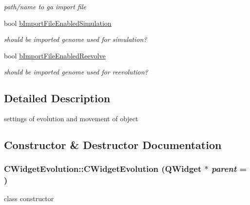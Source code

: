 \begin{DoxyCompactItemize}
\begin{DoxyCompactList}\small\item\em path/name to ga import file \item\end{DoxyCompactList}\item 
\hypertarget{classCWidgetEvolution_a84cb3c7dd3d052de094c1a306b473395}{
bool \hyperlink{classCWidgetEvolution_a84cb3c7dd3d052de094c1a306b473395}{bImportFileEnabledSimulation}}
\label{classCWidgetEvolution_a84cb3c7dd3d052de094c1a306b473395}

\begin{DoxyCompactList}\small\item\em should be imported genome used for simulation? \item\end{DoxyCompactList}\item 
\hypertarget{classCWidgetEvolution_a8bdd4c21118cc14b35a9c24c44357401}{
bool \hyperlink{classCWidgetEvolution_a8bdd4c21118cc14b35a9c24c44357401}{bImportFileEnabledReevolve}}
\label{classCWidgetEvolution_a8bdd4c21118cc14b35a9c24c44357401}

\begin{DoxyCompactList}\small\item\em should be imported genome used for reevolution? \item\end{DoxyCompactList}\end{DoxyCompactItemize}


\subsection{Detailed Description}
settings of evolution and movement of object 

\subsection{Constructor \& Destructor Documentation}
\hypertarget{classCWidgetEvolution_acc38dd902ec3ce3f9841e421d8df67e3}{
\subsubsection[{CWidgetEvolution}]{\setlength{\rightskip}{0pt plus 5cm}CWidgetEvolution::CWidgetEvolution (QWidget $\ast$ {\em parent} = {})}}
\label{classCWidgetEvolution_acc38dd902ec3ce3f9841e421d8df67e3}
class constructor


